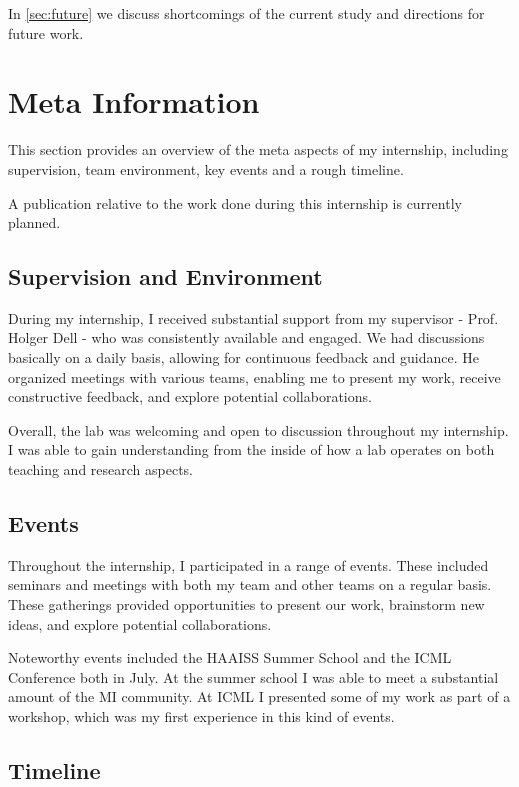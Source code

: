 \documentclass{article}
\begin{document}
In \cref{sec:future} we discuss shortcomings of the current study and directions for future work.

\section{Meta Information}
\label{sec:meta}

This section provides an overview of the meta aspects of my internship, including supervision, team environment, key events and a rough timeline.

A publication relative to the work done during this internship is currently planned.

\subsection{Supervision and Environment}

During my internship, I received substantial support from my supervisor - Prof. Holger Dell - who was consistently available and engaged. We had discussions basically on a daily basis, allowing for continuous feedback and guidance. He organized meetings with various teams, enabling me to present my work, receive constructive feedback, and explore potential collaborations.

Overall, the lab was welcoming and open to discussion throughout my internship. I was able to gain understanding from the inside of how a lab operates on both teaching and research aspects.

\subsection{Events}

Throughout the internship, I participated in a range of events. These included seminars and meetings with both my team and other teams on a regular basis. These gatherings provided opportunities to present our work, brainstorm new ideas, and explore potential collaborations.

Noteworthy events included the HAAISS Summer School and the ICML Conference both in July. At the summer school I was able to meet a substantial amount of the MI community. At ICML I presented some of my work as part of a workshop, which was my first experience in this kind of events.

\subsection{Timeline}
\end{document}
